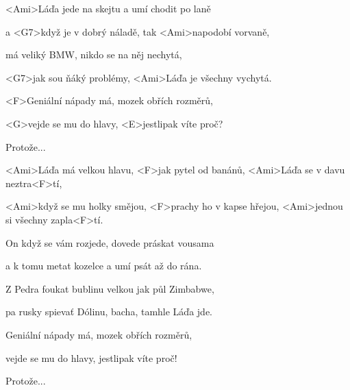 

\zs
<Ami>Láďa jede na skejtu
a umí chodit po laně

a <G7>když je v dobrý náladě,
tak <Ami>napodobí vorvaně,

má veliký BMW,
nikdo se na něj nechytá,

<G7>jak sou ňáký problémy,
<Ami>Láďa je všechny vychytá.

<F>Geniální nápady má, mozek obřích rozměrů,

<G>vejde se mu do hlavy, <E>jestlipak víte proč?

Protože...
\ks

\zr
<Ami>Láďa má velkou hlavu, <F>jak pytel od banánů,
<Ami>Láďa se v davu neztra<F>tí,

<Ami>když se mu holky smějou,
<F>prachy ho v kapse hřejou,
<Ami>jednou si všechny zapla<F>tí.
\kr

\zs
On když se vám rozjede,
dovede práskat vousama

a k tomu metat kozelce
a umí psát až do rána.

Z Pedra foukat bublinu
velkou jak půl Zimbabwe,

pa rusky spievať Dólinu,
bacha, tamhle Láďa jde.

Geniální nápady má, mozek obřích rozměrů,

vejde se mu do hlavy, jestlipak víte proč!

Protože...
\ks

\zr\kr
\zr\kr
\zr\kr

\kp





